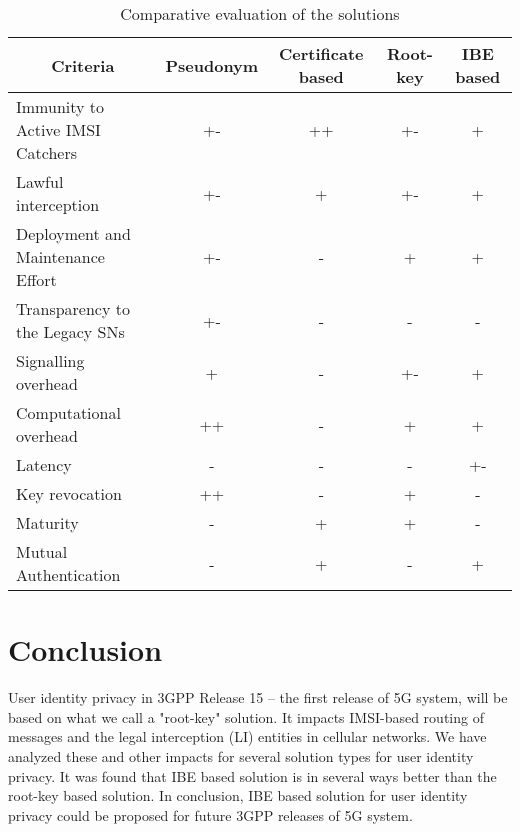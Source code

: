 \documentclass[conference]{IEEEtran}
\begin{document}
\begin{table*}
\begin{normalsize}
\begin{center}
\caption{Comparative evaluation of the solutions}
\begin{tabular}[t]{|l|c|c|c|c|}
\hline
\multicolumn{1}{|c|}{\textbf{Criteria}} & \multicolumn{1}{|c|}{\textbf{Pseudonym}} & \multicolumn{1}{|c|}{\textbf{Certificate based}} & \multicolumn{1}{|c|}{\textbf{Root-key}} & \multicolumn{1}{|c|}{\textbf{IBE based}}\\
\hline \hline
Immunity to Active IMSI Catchers & +- & ++ & +- & + \\ \hline
Lawful interception & +- & + & +- & +  \\ \hline
Deployment and Maintenance Effort & +- & - & + & + \\ \hline
Transparency to the Legacy SNs & +- & - & - & - \\ \hline
Signalling overhead & + & - & +- & + \\ \hline
Computational overhead & ++ & - & + & + \\ \hline
Latency & - & - & - & +- \\ \hline
Key revocation & ++ & - & + & - \\ \hline
Maturity  & - & + & + & - \\ \hline
Mutual Authentication & - & + & - & + \\ \hline
\end{tabular}
\label{table:comparison}
\end{center}
\end{normalsize}
\end{table*}


\section{Conclusion}
User identity privacy in 3GPP  Release 15 -- the first release of 5G system, will be based on what we call a "root-key" solution. It impacts IMSI-based routing of messages and the legal interception (LI) entities in cellular networks.  We have analyzed these and other impacts for several solution types for user identity privacy. It was found that IBE based solution is in several ways better than the root-key based solution. In conclusion, IBE based solution for user identity privacy could be proposed for future 3GPP releases of 5G system.
\end{document}
